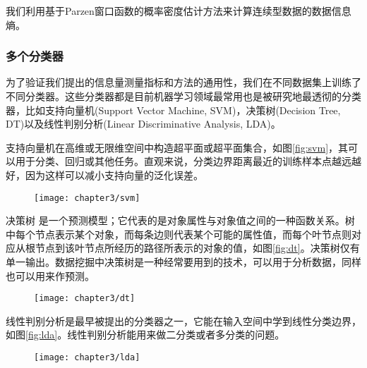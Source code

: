 我们利用基于Parzen窗口函数的概率密度估计方法来计算连续型数据的数据信息熵。

\subsubsection{多个分类器}

为了验证我们提出的信息量测量指标和方法的通用性，我们在不同数据集上训练了不同分类器。这些分类器都是目前机器学习领域最常用也是被研究地最透彻的分类器，比如支持向量机(Support Vector Machine, SVM)，决策树(Decision Tree, DT)以及线性判别分析(Linear Discriminative Analysis, LDA)。

支持向量机\cite{burges1998tutorial,vapnik2013nature,milenova2005svm}在高维或无限维空间中构造超平面或超平面集合，如图\ref{fig:svm}，其可以用于分类、回归或其他任务。直观来说，分类边界距离最近的训练样本点越远越好，因为这样可以减小支持向量的泛化误差。

\begin{figure}[h]
  \centering
    \texttt{[image: chapter3/svm]}
\end{figure}

决策树\cite{safavian1990survey,hu2015differential} 是一个预测模型；它代表的是对象属性与对象值之间的一种函数关系。树中每个节点表示某个对象，而每条边则代表某个可能的属性值，而每个叶节点则对应从根节点到该叶节点所经历的路径所表示的对象的值，如图\ref{fig:dt}。决策树仅有单一输出。数据挖掘中决策树是一种经常要用到的技术，可以用于分析数据，同样也可以用来作预测。

\begin{figure}[h]
  \centering
    \texttt{[image: chapter3/dt]}
\end{figure}

线性判别分析\cite{webb2003statistical}是最早被提出的分类器之一，它能在输入空间中学到线性分类边界，如图\ref{fig:lda}。线性判别分析能用来做二分类或者多分类的问题。

\begin{figure}[h]
  \centering
    \texttt{[image: chapter3/lda]}
\end{figure}

